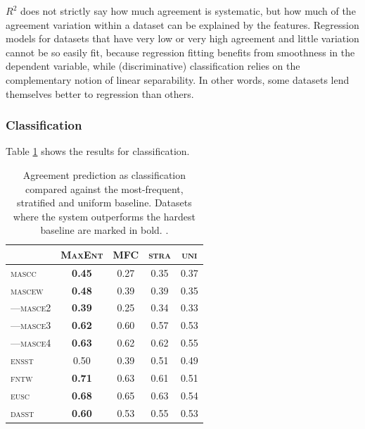 \documentclass[11pt,a4paper]{article}
\begin{document}
$R^2$ does not strictly say how much agreement is systematic, but how much of the agreement variation within a dataset can be explained by the features. Regression models for datasets that have very low or very high agreement and little variation cannot be so easily fit, because regression fitting benefits from smoothness in the dependent variable, while (discriminative) classification relies on the complementary notion of linear separability. In other words, some datasets lend themselves better to regression than others.


\subsubsection{Classification}
Table \ref{tab:classresults} shows the results for classification.


\begin{table}[Ht!]

\begin{center}
  \begin{tabular}{lc|ccc}
 \toprule
 & \textsc{MaxEnt} & \textsc{MFC} & \textsc{stra} & \textsc{uni} \\
 \midrule
 \textsc{mascc} & \textbf{0.45} & 0.27 & 0.35 & 0.37\\ 

 \textsc{mascew} & \textbf{0.48} & 0.39 & 0.39 & 0.35\\ 
---\textsc{masce2} & \textbf{0.39} & 0.25 & 0.34 & 0.33\\ 
---\textsc{masce3} & \textbf{0.62} & 0.60 & 0.57 & 0.53\\ 
---\textsc{masce4} & \textbf{0.63} & 0.62 & 0.62 & 0.55\\ 
\textsc{ensst} & 0.50 & 0.39 & 0.51 & 0.49\\ 
\textsc{fntw} & \textbf{0.71} & 0.63 & 0.61 & 0.51\\ 

\textsc{eusc}  & \textbf{0.68} & 0.65 & 0.63 & 0.54 \\
\textsc{dasst} & \textbf{0.60} & 0.53 & 0.55 & 0.53\\ 

\bottomrule

  \end{tabular}  
\end{center}
\caption{Agreement prediction as classification compared against the most-frequent, stratified and uniform baseline. Datasets where the system outperforms the hardest baseline are marked in bold. \label{tab:classresults}.}
\end{table} 
\end{document}
